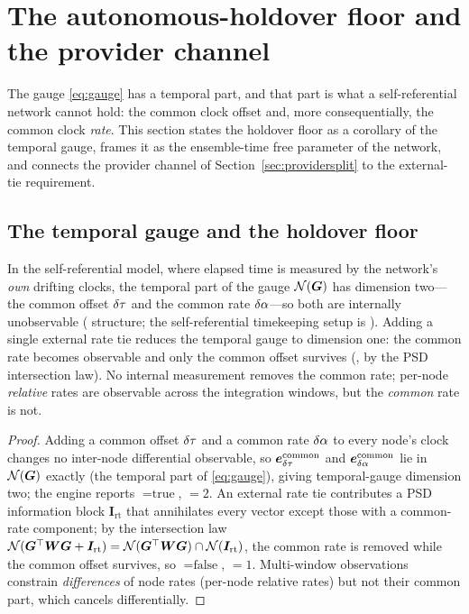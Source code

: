 \section{The autonomous-holdover floor and the provider channel}
\label{sec:holdover}

The gauge \eqref{eq:gauge} has a temporal part, and that part is what a self-referential
network cannot hold: the common clock offset and, more consequentially, the common clock
\emph{rate}. This section states the holdover floor as a corollary of the temporal gauge,
frames it as the ensemble-time free parameter of the network, and connects the provider
channel of Section~\ref{sec:providersplit} to the external-tie requirement.

\subsection{The temporal gauge and the holdover floor}
\label{sec:holdovercor}

\begin{corollary}
\label{cor:holdover}
In the self-referential model, where elapsed time is measured by the network's \emph{own}
drifting clocks, the temporal part of the gauge $\mathcal{N}(\bm{G})$ has dimension two---the common
offset $\delta\tau$ and the common rate $\delta\alpha$---so both are internally unobservable
(\Proven{} structure; the self-referential timekeeping setup is \Modelled{}). Adding a single
external rate tie reduces the temporal gauge to dimension one: the common rate becomes
observable and only the common offset survives (\Proven{}, by the PSD intersection law). No
internal measurement removes the common rate; per-node \emph{relative} rates are observable
across the integration windows, but the \emph{common} rate is not.
\end{corollary}

\begin{proof}
Adding a common offset $\delta\tau$ and a common rate $\delta\alpha$ to every node's clock changes no
inter-node differential observable, so $\bm e_{\delta\tau}^{\mathrm{common}}$ and
$\bm e_{\delta\alpha}^{\mathrm{common}}$ lie in $\mathcal{N}(\bm{G})$ exactly (the temporal part of
\eqref{eq:gauge}), giving temporal-gauge dimension two; the engine reports
${}=\text{true}$, ${}=2$. An external rate
tie contributes a PSD information block $\bm{I}_{\mathrm{rt}}$ that annihilates every vector
except those with a common-rate component; by the intersection law $\mathcal{N}(\bm{G}^\top\bm{W}\bm{G}
+\bm{I}_{\mathrm{rt}})=\mathcal{N}(\bm{G}^\top\bm{W}\bm{G})\cap\mathcal{N}(\bm{I}_{\mathrm{rt}})$, the common
rate is removed while the common offset survives, so ${}=\text{false}$,
${}=1$. Multi-window observations constrain \emph{differences} of
node rates (per-node relative rates) but not their common part, which cancels differentially.
\end{proof}

